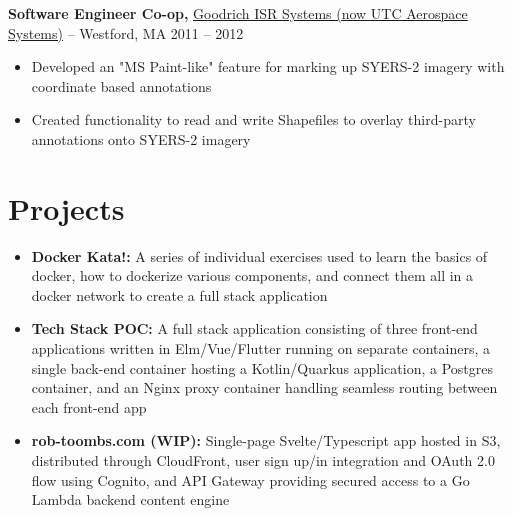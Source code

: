 \documentclass[10pt,letterpaper]{article}
\begin{document}
\textbf{Software Engineer Co-op,} \href{https://www.fstl1992.com/}{Goodrich ISR Systems (now UTC Aerospace Systems)} -- Westford, MA \hfill 2011 -- 2012 \\
\vspace{-9pt}
\begin{itemize}
  \item Developed an "MS Paint-like" feature for marking up SYERS-2 imagery with coordinate based annotations
  \item Created functionality to read and write Shapefiles to overlay third-party annotations onto SYERS-2 imagery
\end{itemize}

\vspace{-18.5pt}


 \section*{Projects}
 \begin{itemize}
   \item \textbf{Docker Kata!:} A series of individual exercises used to learn the basics of docker, how to dockerize various components, and connect them all in a docker network to create a full stack application
   \item \textbf{Tech Stack POC:} A full stack application consisting of three front-end applications written in Elm/Vue/Flutter running on separate containers, a single back-end container hosting a Kotlin/Quarkus application, a Postgres container, and an Nginx proxy container handling seamless routing between each front-end app
   \item \textbf{rob-toombs.com (WIP):} Single-page Svelte/Typescript app hosted in S3, distributed through CloudFront, user sign up/in integration and OAuth 2.0 flow using Cognito, and API Gateway providing secured access to a Go Lambda backend content engine 
 \end{itemize}

\vspace{-18.5pt}

\end{document}
